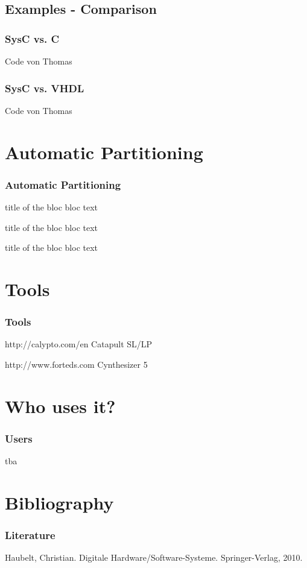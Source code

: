 \documentclass{beamer}
\begin{document}
\subsection{Examples - Comparison}
\begin{frame}\frametitle{SysC vs. C} 
Code von Thomas
\end{frame}
\begin{frame}\frametitle{SysC vs. VHDL} 
Code von Thomas
\end{frame}


\section{Automatic Partitioning}
\begin{frame}\frametitle{Automatic Partitioning} 

\begin{block}{title of the bloc}
bloc text
\end{block}

\begin{exampleblock}{title of the bloc}
bloc text
\end{exampleblock}


\begin{alertblock}{title of the bloc}
bloc text
\end{alertblock}
\end{frame}

\section{Tools}
\begin{frame}\frametitle{Tools} 
http://calypto.com/en 	Catapult SL/LP

http://www.forteds.com	Cynthesizer 5 
\end{frame}

\section{Who uses it?}
\begin{frame}\frametitle{Users} 
tba
\end{frame}
      
\section{Bibliography}
\begin{frame}\frametitle{Literature} 
Haubelt, Christian. Digitale Hardware/Software-Systeme. Springer-Verlag, 2010.
\end{frame}
\end{document}
